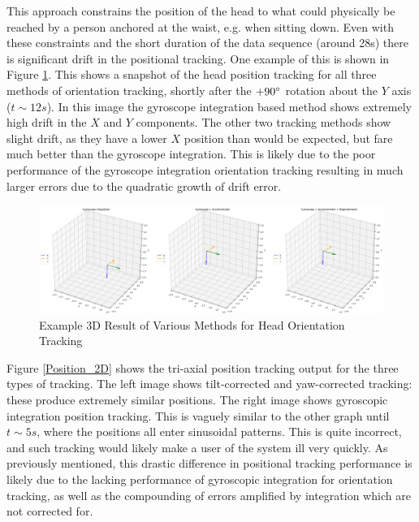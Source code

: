 \documentclass[11pt,a4paper]{article}
\begin{document}
	This approach constrains the position of the head to what could physically be reached by a person anchored at the waist, e.g. when sitting down. Even with these constraints and the short duration of the data sequence (around 28s) there is significant drift in the positional tracking. One example of this is shown in Figure \ref{Position_Y_Rotation}. This shows a snapshot of the head position tracking for all three methods of orientation tracking, shortly after the $+90\degree$ rotation about the $Y$ axis ($t\sim12s$). In this image the gyroscope integration based method shows extremely high drift in the $X$ and $Y$ components. The other two tracking methods show slight drift, as they have a lower $X$ position than would be expected, but fare much better than the gyroscope integration. This is likely due to the poor performance of the gyroscope integration orientation tracking resulting in much larger errors due to the quadratic growth of drift error.
	
	\begin{figure}[h!]
		\centering
		\includegraphics[width=1.0\linewidth]{figures/Position_Tracking_First_Y_Rotation}
		\caption{Example 3D Result of Various Methods for Head Orientation Tracking}
		\label{Position_Y_Rotation}
	\end{figure}

	Figure \ref{Position_2D} shows the tri-axial position tracking output for the three types of tracking. The left image shows tilt-corrected and yaw-corrected tracking: these produce extremely similar positions. The right image shows gyroscopic integration position tracking. This is vaguely similar to the other graph until $t\sim5s$, where the positions all enter sinusoidal patterns. This is quite incorrect, and such tracking would likely make a user of the system ill very quickly. As previously mentioned, this drastic difference in positional tracking performance is likely due to the lacking performance of gyroscopic integration for orientation tracking, as well as the compounding of errors amplified by integration which are not corrected for.
	
\end{document}
